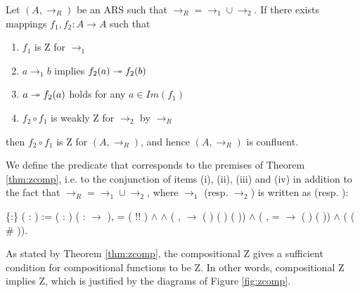     \begin{theorem}\cite{Nakazawa-Fujita2016}\label{thm:zcomp} Let
     $(A,\to_R)$ be an ARS such that $\to_R = \to_1 \cup \to_2$. If
     there exists mappings $f_1,f_2: A \to A$ such that
     \begin{enumerate} \item $f_1$ is Z for $\to_1$ \item $a \to_1 b$
     implies $f_2(a) \twoheadrightarrow f_2(b)$ \item $a \twoheadrightarrow f_2(a)$ holds for any
     $a\in Im(f_1)$ \item $f_2 \circ f_1$ is weakly Z for $\to_2$ by
     $\to_R$ \end{enumerate} then $f_2 \circ f_1$ is Z for
     $(A,\to_R)$, and hence $(A,\to_R)$ is confluent.  \end{theorem}


    We define the predicate  that corresponds to the premises
    of Theorem \ref{thm:zcomp}, i.e. to the conjunction of items
    (i), (ii), (iii) and (iv) in addition to the fact that $\to_R =
    \to_1 \cup \to_2$, where $\to_1$ (resp. $\to_2$) is written as
     (resp. ): \begin{coqdoccode}
\coqdocemptyline
\coqdocnoindent
{}  \{:\} ( : ) := \coqdoctac{\ensuremath{\exists}} ( :  ) ( :  \ensuremath{\rightarrow} ),  = ( !\coqdocvar{\_}! ) \ensuremath{\land}    \ensuremath{\land} (\coqdockw{\ensuremath{\forall}}  ,    \ensuremath{\rightarrow} ( ) ( ) ( )) \ensuremath{\land} (\coqdockw{\ensuremath{\forall}}  ,  =   \ensuremath{\rightarrow} ( )  ( )) \ensuremath{\land} (   ( \# )).\coqdoceol
\coqdocemptyline
\coqdocemptyline
\end{coqdoccode}
As stated by Theorem \ref{thm:zcomp}, the compositional Z gives
    a sufficient condition for compositional functions to be Z. In
    other words, compositional Z implies Z, which is justified by the
    diagrams of Figure \ref{fig:zcomp}.


